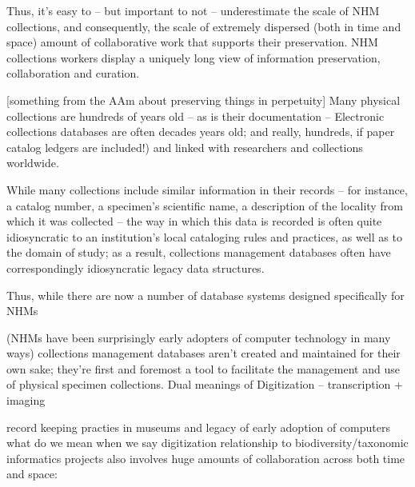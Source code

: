 Thus, it's easy to -- but important to not -- underestimate the scale of NHM collections, and consequently, the scale of extremely dispersed (both in time and space) amount of collaborative work that supports their preservation.
NHM collections workers display a uniquely long view of information preservation, collaboration and curation.

[something from the AAm about preserving things in perpetuity] Many physical collections are hundreds of years old -- as is their documentation -- 
Electronic collections databases are often decades years old; and really, hundreds, if paper catalog ledgers are included!) and linked with researchers and collections worldwide.  

 While many collections include similar information in their records – for instance, a catalog number, a specimen’s scientific name, a description of the locality from which it was collected – the way in which this data is recorded is often quite idiosyncratic to an institution’s local cataloging rules and practices, as well as to the domain of study; as a result, collections management databases often have correspondingly idiosyncratic legacy data structures.

Thus, while there are now a number of database systems designed specifically for NHMs

(NHMs have been surprisingly early adopters of computer technology in many ways)
collections management databases aren’t created and maintained for their own sake; they’re first and foremost a tool to facilitate the management and use of physical specimen collections. 
Dual meanings of Digitization – transcription + imaging


record keeping practies in museums and legacy of early adoption of computers
what do we mean when we say digitization
relationship to biodiversity/taxonomic informatics projects
also involves huge amounts of collaboration across both time and space:

